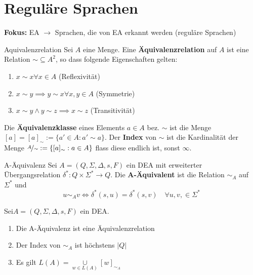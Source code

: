 \section{Reguläre Sprachen}

\textbf{Fokus:} EA $\to$ Sprachen, die von EA erkannt werden (reguläre Sprachen)

\begin{defn}{Aquivalenzrelation}
    Sei $A$ eine Menge. Eine \textbf{Äquivalenzrelation} auf $A$ ist eine Relation $\sim \subseteq A^2$, so dass folgende Eigenschaften gelten:
    
    \begin{enumerate}[label=(\roman*)]
        \item $x \sim x \forall x \in A$ (Reflexivität)
        \item $x \sim y \implies y \sim x \forall x, y \in A$ (Symmetrie)
        \item $x \sim y \land y \sim z  \implies x \sim z$ (Transitivität)
    \end{enumerate}
    
    Die \textbf{Äquivalenzklasse} eines Elements $a \in A$ bez. $\sim$ ist die Menge $[a] = [a]_\sim := \{a' \in A : a' \sim a\}$. Der \textbf{Index} von $\sim$ ist die Kardinalität der Menge $\nicefrac{A}{\sim} := \{[a]_\sim : a \in A\}$ flass diese endlich ist, sonst $\infty$.
\end{defn}

\begin{defn}{A-Äquivalenz}
    Sei $A = (Q, \Sigma, \Delta, s, F)$ ein DEA mit erweiterter Übergangsrelation $\delta^* : Q \times \Sigma^* \to Q$. Die \textbf{A-Äquivalent} ist die Relation $\sim_A$ auf $\Sigma^*$ und
    $$u \sim_A v \iff \delta^*(s, u) = \delta^*(s, v) \quad \forall u, v, \in \Sigma^*$$
\end{defn}

\begin{bem}
    Sei$A = (Q, \Sigma, \Delta, s, F)$ ein DEA.
    
    \begin{enumerate}[label=(\roman*)]
        \item Die A-Äquivalenz ist eine Äquivalenzrelation
        \item Der Index von $\sim_A$ ist höchstens $|Q|$
        \item Es gilt $L(A) = \underset{w \in L(A)}{\cup} [w]_{\sim_A}$
    \end{enumerate}
\end{bem}

